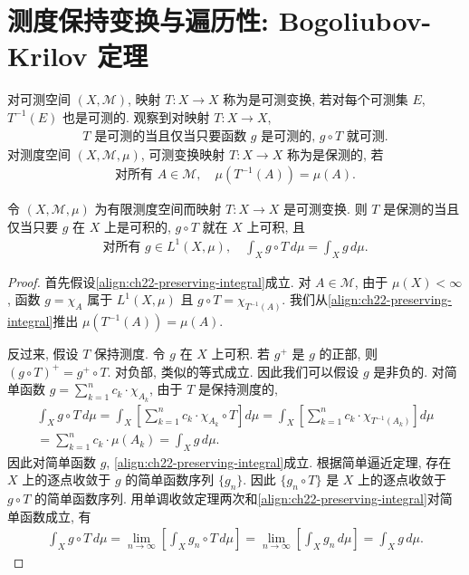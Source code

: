 \documentclass[../../main.tex]{subfiles}
\begin{document}
\section{测度保持变换与遍历性: Bogoliubov-Krilov 定理}\label{section:ch22-ergodic}

对可测空间 $(X,\mathcal{M})$, 映射 $T:X\to X$ 称为是可测变换, 若对每个可测集 $E$, $T^{-1}(E)$ 也是可测的. 观察到对映射 $T:X\to X$,
\begin{align}
T\text{ 是可测的当且仅当只要函数 }g\text{ 是可测的, }g\circ T\text{ 就可测}.
\label{align:ch22-measurable-transform}
\end{align}
对测度空间 $(X,\mathcal{M},\mu)$, 可测变换映射 $T:X\to X$ 称为是保测的, 若
\begin{align*}
\text{对所有 }A\in\mathcal{M},\quad\mu(T^{-1}(A))=\mu(A).
\end{align*}

\begin{proposition}[保测变换的积分刻画]\label{proposition:ch22-measure-preserving-integral}
令 $(X,\mathcal{M},\mu)$ 为有限测度空间而映射 $T:X\to X$ 是可测变换. 则 $T$ 是保测的当且仅当只要 $g$ 在 $X$ 上是可积的, $g\circ T$ 就在 $X$ 上可积, 且
\begin{align}
\text{对所有 }g\in L^{1}(X,\mu),\quad\int_{X}g\circ T\,d\mu=\int_{X}g\,d\mu.
\label{align:ch22-preserving-integral}
\end{align}
\end{proposition}

\begin{proof}
首先假设\eqref{align:ch22-preserving-integral}成立. 对 $A\in\mathcal{M}$, 由于 $\mu(X)<\infty$, 函数 $g=\chi_{A}$ 属于 $L^{1}(X,\mu)$ 且 $g\circ T=\chi_{T^{-1}(A)}$. 我们从\eqref{align:ch22-preserving-integral}推出 $\mu(T^{-1}(A))=\mu(A)$.

反过来, 假设 $T$ 保持测度. 令 $g$ 在 $X$ 上可积. 若 $g^{+}$ 是 $g$ 的正部, 则 $(g\circ T)^{+}=g^{+}\circ T$. 对负部, 类似的等式成立. 因此我们可以假设 $g$ 是非负的. 对简单函数 $g=\sum_{k=1}^{n}c_{k}\cdot\chi_{A_{k}}$, 由于 $T$ 是保持测度的,
\begin{align*}
\int_{X}g\circ T\,d\mu=\int_{X}\left[\sum_{k=1}^{n}c_{k}\cdot\chi_{A_{k}}\circ T\right]d\mu=\int_{X}\left[\sum_{k=1}^{n}c_{k}\cdot\chi_{T^{-1}(A_{k})}\right]d\mu\\
=\sum_{k=1}^{n}c_{k}\cdot\mu(A_{k})=\int_{X}g\,d\mu.
\end{align*}
因此对简单函数 $g$, \eqref{align:ch22-preserving-integral}成立. 根据简单逼近定理, 存在 $X$ 上的逐点收敛于 $g$ 的简单函数序列 $\{g_{n}\}$. 因此 $\{g_{n}\circ T\}$ 是 $X$ 上的逐点收敛于 $g\circ T$ 的简单函数序列. 用单调收敛定理两次和\eqref{align:ch22-preserving-integral}对简单函数成立, 有
\begin{align*}
\int_{X}g\circ T\,d\mu=\lim_{n\to\infty}\left[\int_{X}g_{n}\circ T\,d\mu\right]=\lim_{n\to\infty}\left[\int_{X}g_{n}\,d\mu\right]=\int_{X}g\,d\mu.
\end{align*}
\end{proof}
\end{document}
